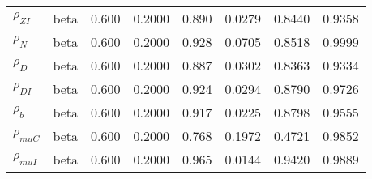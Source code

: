 \begin{center}
\begin{longtable}{llcccccc}
${\rho_{ZI}}$ & beta &   0.600 & 0.2000 &   0.890& 0.0279 &  0.8440 &  0.9358 \\ 
${\rho_N}$ & beta &   0.600 & 0.2000 &   0.928& 0.0705 &  0.8518 &  0.9999 \\ 
${\rho_D}$ & beta &   0.600 & 0.2000 &   0.887& 0.0302 &  0.8363 &  0.9334 \\ 
${\rho_{DI}}$ & beta &   0.600 & 0.2000 &   0.924& 0.0294 &  0.8790 &  0.9726 \\ 
${\rho_b}$ & beta &   0.600 & 0.2000 &   0.917& 0.0225 &  0.8798 &  0.9555 \\ 
${\rho_{muC}}$ & beta &   0.600 & 0.2000 &   0.768& 0.1972 &  0.4721 &  0.9852 \\ 
${\rho_{muI}}$ & beta &   0.600 & 0.2000 &   0.965& 0.0144 &  0.9420 &  0.9889 \\ 
\end{longtable}
 \end{center}
